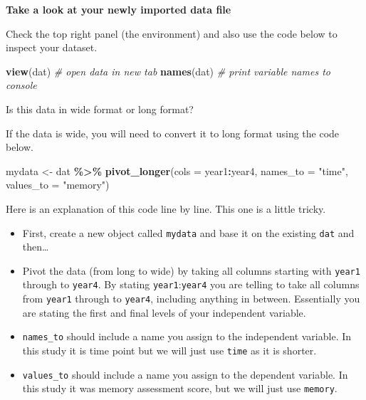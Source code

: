 \documentclass[
]{book}
\newenvironment{Shaded}{\begin{snugshade}}{\end{snugshade}}
\newcommand{\AttributeTok}[1]{\textcolor[rgb]{0.13,0.29,0.53}{#1}}
\newcommand{\CommentTok}[1]{\textcolor[rgb]{0.56,0.35,0.01}{\textit{#1}}}
\newcommand{\FunctionTok}[1]{\textcolor[rgb]{0.13,0.29,0.53}{\textbf{#1}}}
\newcommand{\NormalTok}[1]{#1}
\newcommand{\OtherTok}[1]{\textcolor[rgb]{0.56,0.35,0.01}{#1}}
\newcommand{\SpecialCharTok}[1]{\textcolor[rgb]{0.81,0.36,0.00}{\textbf{#1}}}
\newcommand{\StringTok}[1]{\textcolor[rgb]{0.31,0.60,0.02}{#1}}
\begin{document}
\textbf{Take a look at your newly imported data file}

Check the top right panel (the environment) and also use the code below to inspect your dataset.

\begin{Shaded}
\begin{Highlighting}[]
\FunctionTok{view}\NormalTok{(dat) }\CommentTok{\# open data in new tab}
\FunctionTok{names}\NormalTok{(dat) }\CommentTok{\# print variable names to console}
\end{Highlighting}
\end{Shaded}

Is this data in wide format or long format?

If the data is wide, you will need to convert it to long format using the code below.

\begin{Shaded}
\begin{Highlighting}[]
\NormalTok{mydata }\OtherTok{\textless{}{-}}\NormalTok{ dat }\SpecialCharTok{\%\textgreater{}\%}
  \FunctionTok{pivot\_longer}\NormalTok{(}\AttributeTok{cols =}\NormalTok{ year1}\SpecialCharTok{:}\NormalTok{year4,}
               \AttributeTok{names\_to =} \StringTok{"time"}\NormalTok{,}
               \AttributeTok{values\_to =} \StringTok{"memory"}\NormalTok{)}
\end{Highlighting}
\end{Shaded}

Here is an explanation of this code line by line. This one is a little tricky.

\begin{itemize}
\item
  First, create a new object called \texttt{mydata} and base it on the existing \texttt{dat} and then\ldots{}
\item
  Pivot the data (from long to wide) by taking all columns starting with \texttt{year1} through to \texttt{year4}. By stating \texttt{year1}:\texttt{year4} you are telling to take all columns from \texttt{year1} through to \texttt{year4}, including anything in between. Essentially you are stating the first and final levels of your independent variable.
\item
  \texttt{names\_to} should include a name you assign to the independent variable. In this study it is time point but we will just use \texttt{time} as it is shorter.
\item
  \texttt{values\_to} should include a name you assign to the dependent variable. In this study it was memory assessment score, but we will just use \texttt{memory}.
\end{itemize}
\end{document}

